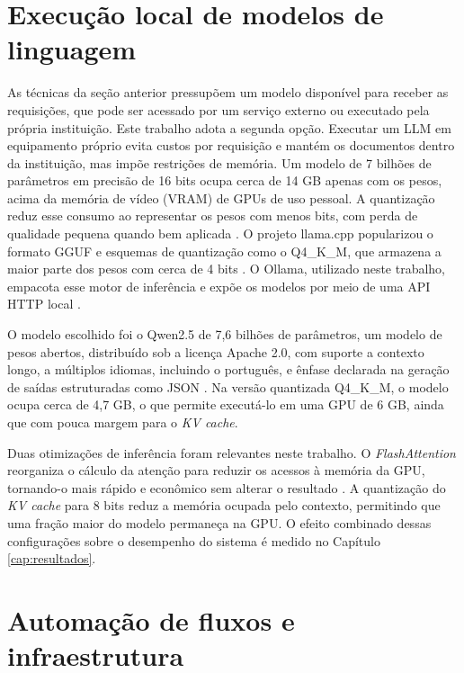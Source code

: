 \section{Execução local de modelos de linguagem}
\label{sec:local}

As técnicas da seção anterior pressupõem um modelo disponível para receber as requisições, que pode ser acessado por um serviço externo ou executado pela própria instituição. Este trabalho adota a segunda opção. Executar um LLM em equipamento próprio evita custos por requisição e mantém os documentos dentro da instituição, mas impõe restrições de memória. Um modelo de 7 bilhões de parâmetros em precisão de 16 bits ocupa cerca de 14 GB apenas com os pesos, acima da memória de vídeo (VRAM) de GPUs de uso pessoal. A quantização reduz esse consumo ao representar os pesos com menos bits, com perda de qualidade pequena quando bem aplicada \cite{Dettmers2022}. O projeto llama.cpp popularizou o formato GGUF e esquemas de quantização como o Q4\_K\_M, que armazena a maior parte dos pesos com cerca de 4 bits \cite{LlamaCpp}. O Ollama, utilizado neste trabalho, empacota esse motor de inferência e expõe os modelos por meio de uma API HTTP local \cite{OllamaDocs}.

O modelo escolhido foi o Qwen2.5 de 7,6 bilhões de parâmetros, um modelo de pesos abertos, distribuído sob a licença Apache 2.0, com suporte a contexto longo, a múltiplos idiomas, incluindo o português, e ênfase declarada na geração de saídas estruturadas como JSON \cite{Qwen2024}. Na versão quantizada Q4\_K\_M, o modelo ocupa cerca de 4,7 GB, o que permite executá-lo em uma GPU de 6 GB, ainda que com pouca margem para o \textit{KV cache}.

Duas otimizações de inferência foram relevantes neste trabalho. O \textit{FlashAttention} reorganiza o cálculo da atenção para reduzir os acessos à memória da GPU, tornando-o mais rápido e econômico sem alterar o resultado \cite{Dao2022}. A quantização do \textit{KV cache} para 8 bits reduz a memória ocupada pelo contexto, permitindo que uma fração maior do modelo permaneça na GPU. O efeito combinado dessas configurações sobre o desempenho do sistema é medido no Capítulo \ref{cap:resultados}.

\section{Automação de fluxos e infraestrutura}
\label{sec:automacao}

